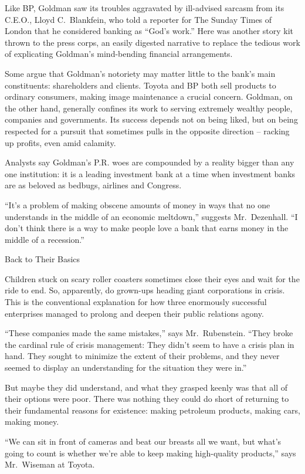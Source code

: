 ﻿\documentclass[12pt]{article}
\begin{document}
Like BP, Goldman saw its troubles aggravated by ill-advised sarcasm from its C.E.O., Lloyd
C.~Blankfein, who told a reporter for The Sunday Times of London that he considered banking as
``God's work.'' Here was another story kit thrown to the press corps, an easily digested narrative
to replace the tedious work of explicating Goldman's mind-bending financial arrangements.

Some argue that Goldman's notoriety may matter little to the bank's main constituents: shareholders
and clients. Toyota and BP both sell products to ordinary consumers, making image maintenance a
crucial concern. Goldman, on the other hand, generally confines its work to serving extremely
wealthy people, companies and governments. Its success depends not on being liked, but on being
respected for a pursuit that sometimes pulls in the opposite direction -- racking up profits, even
amid calamity.

Analysts say Goldman's P.R. woes are compounded by a reality bigger than any one institution: it is
a leading investment bank at a time when investment banks are as beloved as bedbugs, airlines and
Congress.

``It's a problem of making obscene amounts of money in ways that no one understands in the middle of
an economic meltdown,'' suggests Mr.~Dezenhall. ``I don't think there is a way to make people love a
bank that earns money in the middle of a recession.''

Back to Their Basics

Children stuck on scary roller coasters sometimes close their eyes and wait for the ride to end. So,
apparently, do grown-ups heading giant corporations in crisis. This is the conventional explanation
for how three enormously successful enterprises managed to prolong and deepen their public relations
agony.

``These companies made the same mistakes,'' says Mr.~Rubenstein. ``They broke the cardinal rule of
crisis management: They didn't seem to have a crisis plan in hand. They sought to minimize the
extent of their problems, and they never seemed to display an understanding for the situation they
were in.''

But maybe they did understand, and what they grasped keenly was that all of their options were poor.
There was nothing they could do short of returning to their fundamental reasons for existence:
making petroleum products, making cars, making money.

``We can sit in front of cameras and beat our breasts all we want, but what's going to count is
whether we're able to keep making high-quality products,'' says Mr.~Wiseman at Toyota.
\end{document}
